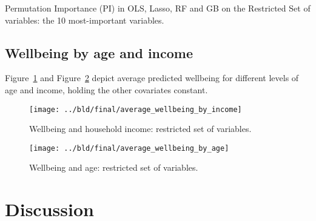 \documentclass[11pt, a4paper, leqno]{article}
\begin{document}
\begin{table}[htbp]
    \centering
    
    \caption{Permutation Importance (PI) in OLS, Lasso, RF and GB on the Restricted Set of variables: the 10 most-important variables.}
    \label{tab:permutation_importance_table}
\end{table}


\subsection{Wellbeing by age and income}

Figure~\ref{fig:average_wellbeing_by_income} and Figure~\ref{fig:average_wellbeing_by_age} depict
average predicted wellbeing for different levels of age and income, holding the other covariates
constant.

\begin{figure}[htbp]
    \centering
    \texttt{[image: ../bld/final/average\_wellbeing\_by\_income]}
    \caption{Wellbeing and household income: restricted set of variables.}
    \label{fig:average_wellbeing_by_income}
\end{figure}

\begin{figure}[htbp]
    \centering
    \texttt{[image: ../bld/final/average\_wellbeing\_by\_age]}
    \caption{Wellbeing and age: restricted set of variables.}
    \label{fig:average_wellbeing_by_age}
\end{figure}



\section{Discussion} %
\label{sec:discussion}





\printbibliography
{}



\end{document}
